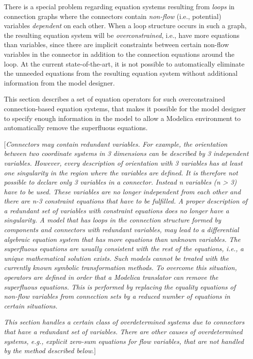 There is a special problem regarding equation systems resulting from
\emph{loops} in connection graphs where the connectors contain
\emph{non-flow} (i.e., potential) variables \emph{dependent} on each
other. When a loop structure occurs in such a graph, the resulting
equation system will be \emph{overconstrained}, i.e., have more
equations than variables, since there are implicit constraints between
certain non-flow variables in the connector in addition to the
connection equations around the loop. At the current state-of-the-art,
it is not possible to automatically eliminate the unneeded equations
from the resulting equation system without additional information from
the model designer.

This section describes a set of equation operators for such
overconstrained connection-based equation systems, that makes it
possible for the model designer to specify enough information in the
model to allow a Modelica environment to automatically remove the
superfluous equations.

{[}\emph{Connectors may contain redundant variables. For example, the
orientation between two coordinate systems in 3 dimensions can be
described by 3 independent variables. However, every description of
orientation with 3 variables has at least one singularity in the region
where the variables are defined. It is therefore not possible to declare
only 3 variables in a connector. Instead n variables (n \textgreater{}
3) have to be used. These variables are no longer independent from each
other and there are n-3 constraint equations that have to be fulfilled.
A proper description of a redundant set of variables with constraint
equations does no longer have a singularity. A model that has loops in
the connection structure formed by components and connectors with
redundant variables, may lead to a differential algebraic equation
system that has more equations than unknown variables. The superfluous
equations are usually consistent with the rest of the equations, i.e., a
unique mathematical solution exists. Such models cannot be treated with
the currently known symbolic transformation methods. To overcome this
situation, operators are defined in order that a Modelica translator can
remove the superfluous equations. This is performed by replacing the
equality equations of non-flow variables from connection sets by a
reduced number of equations in certain situations.}

\emph{This section handles a certain class of overdetermined systems due
to connectors that have a redundant set of variables. There are other
causes of overdetermined systems, e.g., explicit zero-sum equations for
flow variables, that are not handled by the method described below}.{]}

